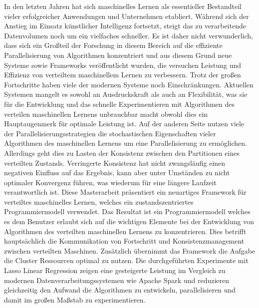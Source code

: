 % 
% 
%
In den letzten Jahren hat sich maschinelles Lernen als essentieller Bestandteil vieler erfolgreicher Anwendungen und Unternehmen etabliert.
W\"ahrend sich der Anstieg im Einsatz k\"unstlicher Intelligenz fortsetzt, steigt das zu verarbeitende Datenvolumen noch um ein vielfaches schneller.
Es ist daher nicht verwunderlich, dass sich ein Gro{\ss}teil der Forschung in diesem Bereich auf die effiziente Parallelisierung von Algorithmen konzentriert und aus diesem Grund neue Systeme sowie Frameworks ver\"offentlicht wurden, die versuchen Leistung und Effizienz von verteiltem maschinellem Lernen zu verbessern.
Trotz der gro{\ss}en Fortschritte haben viele der modernen Systeme noch Einschr\"ankungen.
Aktuellen Systemen mangelt es sowohl an Ausdruckskraft als auch an Flexibilit\"at, was sie f\"ur die Entwicklung und das schnelle Experimentieren mit Algorithmen des verteilen maschinellen Lernens unbrauchbar macht obwohl dies ein Hauptaugenmerk f\"ur optimale Leistung ist.
Auf der anderen Seite nutzen viele der Parallelisierungsstrategien die stochastischen Eigenschaften vieler Algorithmen des maschinellen Lernens um eine Parallelisierung zu erm\"oglichen.
Allerdings geht dies zu Lasten der Konsistenz zwischen den Partitionen eines verteilten Zustands.
Verringerte Konsistenz hat nicht zwangsl\"aufig einen negativen Einfluss auf das Ergebnis, kann aber unter Umst\"anden zu nicht optimaler Konvergenz f\"uhren, was wiederum f\"ur eine l\"angere Laufzeit verantwortlich ist.
Diese Masterarbeit pr\"asentiert ein neuartiges Framework f\"ur verteiltes maschinelles Lernen, welches ein zustandszentriertes Programmiermodell verwendet.
Das Resultat ist ein Programmiermodell welches es dem Benutzer erlaubt sich auf die wichtigen Elemente bei der Entwicklung von Algorithmen des verteilten maschinellen Lernens zu konzentrieren.
Dies betrifft haupts\"achlich die Kommunikation von Fortschritt und Konsistenzmanagement zwischen verteilten Maschinen.
Zus\"atzlich \"ubernimmt das Framework die Aufgabe die Cluster Ressourcen optimal zu nutzen.
Die durchgef\"uhrten Experimente mit Lasso Linear Regression zeigen eine gesteigerte Leistung im Vergleich zu modernen Datenverarbeitungssystemen wie Apache Spark und reduzieren gleichzeitig den Aufwand die Algorithmen zu entwickeln, parallelisieren und damit im gro{\ss}en Ma{\ss}stab zu experimentieren.